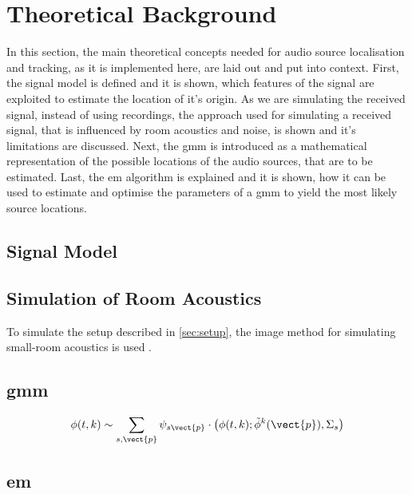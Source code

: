 \chapter{Theoretical Background}
\label{chap:theory}


In this section, the main theoretical concepts needed for audio source localisation and tracking, as it is implemented here, are laid out and put into context. First, the signal model is defined and it is shown, which features of the signal are exploited to estimate the location of it's origin. As we are simulating the received signal, instead of using recordings, the approach used for simulating a received signal, that is influenced by room acoustics and noise, is shown and it's limitations are discussed. Next, the \acrfull{gmm} is introduced as a mathematical representation of the possible locations of the audio sources, that are to be estimated. Last, the \acrfull{em} algorithm is explained and it is shown, how it can be used to estimate and optimise the parameters of a \acrshort{gmm} to yield the most likely source locations.

\section{Signal Model}
\label{sec:signal}


\section{Simulation of Room Acoustics}
\label{sec:simulation}
To simulate the setup described in \ref{sec:setup}, the image method for simulating small-room acoustics is used \cite{Allen1979}.

\section{\acrfull{gmm}}
\label{sec:gmm}
\begin{equation}
	\phi(t,k)\sim\sum_{s,\vect{p}}\psi_{s\vect{p}}\cdot\big(\phi(t,k);\tilde\phi^k(\vect{p}),\Sigma_s\big)
\end{equation}

\section{\acrfull{em}}
\label{sec:em}
